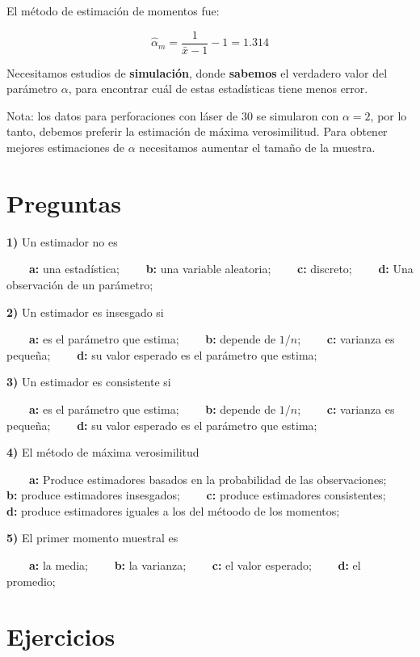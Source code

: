 \documentclass[
]{book}
\begin{document}
El método de estimación de momentos fue:

\[\hat{\alpha}_m=\frac{1}{\bar{x}-1}-1=1.314\]

Necesitamos estudios de \textbf{simulación}, donde \textbf{sabemos} el verdadero valor del parámetro \(\alpha\), para encontrar cuál de estas estadísticas tiene menos error.

Nota: los datos para perforaciones con láser de \(30\) se simularon con \(\alpha=2\), por lo tanto, debemos preferir la estimación de máxima verosimilitud. Para obtener mejores estimaciones de \(\alpha\) necesitamos aumentar el tamaño de la muestra.

\hypertarget{preguntas-9}{%
\section{Preguntas}\label{preguntas-9}}

\textbf{1)} Un estimador no es

\textbf{\(\qquad\)a:} una estadística;
\textbf{\(\qquad\)b:} una variable aleatoria;
\textbf{\(\qquad\)c:} discreto;
\textbf{\(\qquad\)d:} Una observación de un parámetro;

\textbf{2)} Un estimador es insesgado si

\textbf{\(\qquad\)a:} es el parámetro que estima;
\textbf{\(\qquad\)b:} depende de \(1/n\);
\textbf{\(\qquad\)c:} varianza es pequeña;
\textbf{\(\qquad\)d:} su valor esperado es el parámetro que estima;

\textbf{3)} Un estimador es consistente si

\textbf{\(\qquad\)a:} es el parámetro que estima;
\textbf{\(\qquad\)b:} depende de \(1/n\);
\textbf{\(\qquad\)c:} varianza es pequeña;
\textbf{\(\qquad\)d:} su valor esperado es el parámetro que estima;

\textbf{4)} El método de máxima verosimilitud

\textbf{\(\qquad\)a:} Produce estimadores basados en la probabilidad de las observaciones;
\textbf{\(\qquad\)b:} produce estimadores insesgados;
\textbf{\(\qquad\)c:} produce estimadores consistentes;
\textbf{\(\qquad\)d:} produce estimadores iguales a los del métoodo de los momentos;

\textbf{5)} El primer momento muestral es

\textbf{\(\qquad\)a:} la media;
\textbf{\(\qquad\)b:} la varianza;
\textbf{\(\qquad\)c:} el valor esperado;
\textbf{\(\qquad\)d:} el promedio;

\hypertarget{ejercicios-10}{%
\section{Ejercicios}\label{ejercicios-10}}
\end{document}
